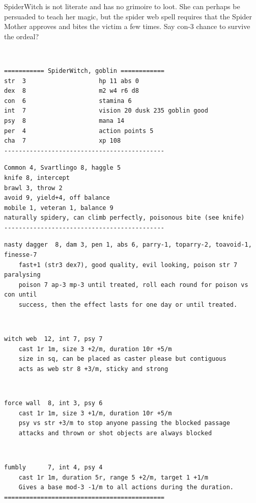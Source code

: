 SpiderWitch is not literate and has no grimoire to loot. She can perhaps be persuaded to teach her magic, but the spider web spell requires that the Spider Mother approves and bites the victim a few times. Say con-3 chance to survive the ordeal?

\

\small \begin{samepage} \begin{verbatim}
=========== SpiderWitch, goblin ============
str  3                    hp 11 abs 0
dex  8                    m2 w4 r6 d8
con  6                    stamina 6
int  7                    vision 20 dusk 235 goblin good
psy  8                    mana 14
per  4                    action points 5
cha  7                    xp 108
--------------------------------------------
\end{verbatim} \goodbreak \begin{verbatim}
Common 4, Svartlingo 8, haggle 5
knife 8, intercept
brawl 3, throw 2
avoid 9, yield+4, off balance
mobile 1, veteran 1, balance 9
naturally spidery, can climb perfectly, poisonous bite (see knife)
--------------------------------------------
\end{verbatim} \goodbreak \begin{verbatim}
nasty dagger  8, dam 3, pen 1, abs 6, parry-1, toparry-2, toavoid-1, finesse-7
    fast+1 (str3 dex7), good quality, evil looking, poison str 7 paralysing
    poison 7 ap-3 mp-3 until treated, roll each round for poison vs con until
    success, then the effect lasts for one day or until treated.
\end{verbatim} \end{samepage}   \   \goodbreak \begin{samepage} \begin{verbatim}
witch web  12, int 7, psy 7
    cast 1r 1m, size 3 +2/m, duration 10r +5/m
    size in sq, can be placed as caster please but contiguous
    acts as web str 8 +3/m, sticky and strong
\end{verbatim} \end{samepage}   \   \goodbreak \begin{samepage} \begin{verbatim}
force wall  8, int 3, psy 6
    cast 1r 1m, size 3 +1/m, duration 10r +5/m
    psy vs str +3/m to stop anyone passing the blocked passage
    attacks and thrown or shot objects are always blocked
\end{verbatim} \end{samepage}   \   \goodbreak \begin{samepage} \begin{verbatim}
fumbly      7, int 4, psy 4
    cast 1r 1m, duration 5r, range 5 +2/m, target 1 +1/m
    Gives a base mod-3 -1/m to all actions during the duration.
============================================
\end{verbatim} \end{samepage} \normalsize

